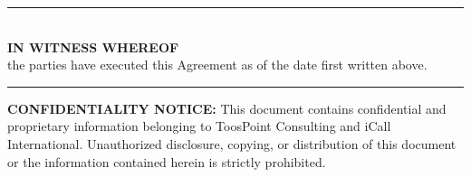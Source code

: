 \documentclass{toospoint}
\begin{document}
\begin{center}
  {\color{TPBorder}\rule{0.7\textwidth}{0.5pt}}\\[6pt]
  {\sffamily\bfseries\color{TPDark}IN WITNESS WHEREOF}\\[4pt]
  {\sffamily\small\color{TPGray}the parties have executed this Agreement as of the date first written above.}\\[6pt]
  {\color{TPBorder}\rule{0.7\textwidth}{0.5pt}}
\end{center}

\vspace{20pt}

\noindent
{}
\hfill
{}

\vspace{32pt}

\begin{mdframed}[
  linecolor=TPBorder,
  linewidth=1pt,
  roundcorner=4pt,
  backgroundcolor=TPLight,
  innerleftmargin=14pt,
  innerrightmargin=14pt,
  innertopmargin=10pt,
  innerbottommargin=10pt
]
\sffamily\footnotesize\color{TPGray}
\textbf{CONFIDENTIALITY NOTICE:} This document contains confidential and proprietary
information belonging to ToosPoint Consulting and iCall International. Unauthorized
disclosure, copying, or distribution of this document or the information contained herein
is strictly prohibited.
\end{mdframed}
\end{document}
